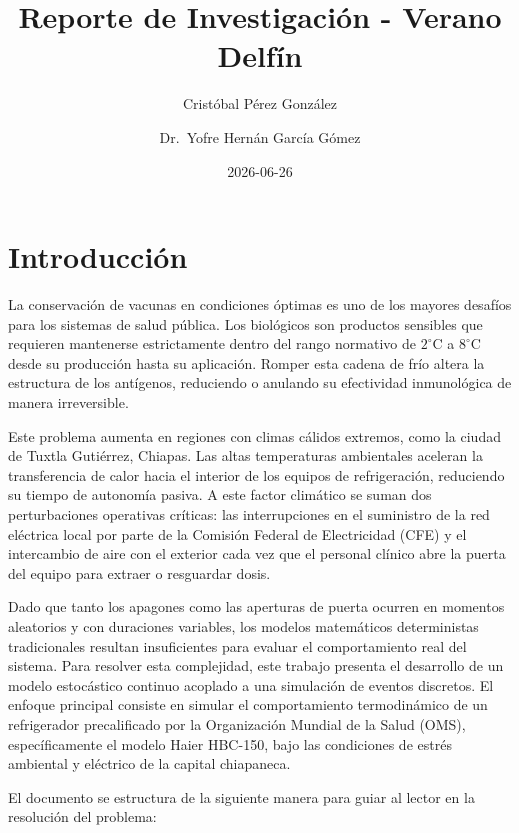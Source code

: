 \documentclass[
  spanish,
  letterpaper,
  DIV=11,
  numbers=noendperiod]{scrreprt}
\title{Reporte de Investigación - Verano Delfín}
\author{Cristóbal Pérez González \and Dr.~Yofre Hernán García Gómez}
\date{2026-06-26}
\renewcommand*\contentsname{Tabla de contenidos}
\newcommand\contentsname{Tabla de contenidos}
\theoremstyle{plain}
\theoremstyle{definition}
\theoremstyle{remark}
\begin{document}
\maketitle

\renewcommand*\contentsname{Tabla de contenidos}
{
\hypersetup{linkcolor=}
\setcounter{tocdepth}{2}
\tableofcontents
}


\chapter{Introducción}\label{introducciuxf3n}

La conservación de vacunas en condiciones óptimas es uno de los mayores
desafíos para los sistemas de salud pública. Los biológicos son
productos sensibles que requieren mantenerse estrictamente dentro del
rango normativo de \(2^\circ\text{C}\) a \(8^\circ\text{C}\) desde su
producción hasta su aplicación. Romper esta cadena de frío altera la
estructura de los antígenos, reduciendo o anulando su efectividad
inmunológica de manera irreversible.

Este problema aumenta en regiones con climas cálidos extremos, como la
ciudad de Tuxtla Gutiérrez, Chiapas. Las altas temperaturas ambientales
aceleran la transferencia de calor hacia el interior de los equipos de
refrigeración, reduciendo su tiempo de autonomía pasiva. A este factor
climático se suman dos perturbaciones operativas críticas: las
interrupciones en el suministro de la red eléctrica local por parte de
la Comisión Federal de Electricidad (CFE) y el intercambio de aire con
el exterior cada vez que el personal clínico abre la puerta del equipo
para extraer o resguardar dosis.

Dado que tanto los apagones como las aperturas de puerta ocurren en
momentos aleatorios y con duraciones variables, los modelos matemáticos
deterministas tradicionales resultan insuficientes para evaluar el
comportamiento real del sistema. Para resolver esta complejidad, este
trabajo presenta el desarrollo de un modelo estocástico continuo
acoplado a una simulación de eventos discretos. El enfoque principal
consiste en simular el comportamiento termodinámico de un refrigerador
precalificado por la Organización Mundial de la Salud (OMS),
específicamente el modelo Haier HBC-150, bajo las condiciones de estrés
ambiental y eléctrico de la capital chiapaneca.

El documento se estructura de la siguiente manera para guiar al lector
en la resolución del problema:
\end{document}
